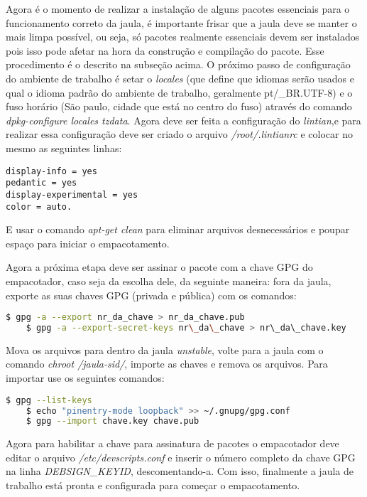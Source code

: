 Agora é o momento de realizar a instalação de alguns pacotes essenciais para o funcionamento correto da jaula, é importante frisar que a jaula deve se manter o mais limpa possível, ou seja, só pacotes realmente essenciais devem ser instalados pois isso pode afetar na hora da construção e compilação do pacote. Esse procedimento é o descrito na subseção acima. O próximo passo de configuração do ambiente de trabalho é setar o \textit{locales} (que define que idiomas serão usados e qual o idioma padrão do ambiente de trabalho, geralmente pt/\_BR.UTF-8) e o fuso horário (São paulo, cidade que está no centro do fuso) através do comando \textit{dpkg-configure locales tzdata}. Agora deve ser feita a configuração do \textit{lintian},e para realizar essa configuração deve ser criado o arquivo \textit{/root/.lintianrc} e colocar no mesmo as seguintes linhas: 

\begin{verbatim}
display-info = yes 
pedantic = yes 
display-experimental = yes 
color = auto.
\end{verbatim}

E usar o comando \textit{apt-get clean} para eliminar arquivos desnecessários e poupar espaço para iniciar o empacotamento.

Agora a próxima etapa deve ser assinar o pacote com a chave GPG do empacotador, caso seja da escolha dele, da seguinte maneira: fora da jaula, exporte as suas chaves GPG (privada e pública) com os comandos:

\begin{lstlisting}[language=bash]
	$ gpg -a --export nr_da_chave > nr_da_chave.pub 
	$ gpg -a --export-secret-keys nr\_da\_chave > nr\_da\_chave.key
\end{lstlisting} 

Mova os arquivos para dentro da jaula \textit{unstable}, volte para a jaula com o comando \textit{chroot /jaula-sid/}, importe as chaves e remova os arquivos. Para importar use os seguintes comandos: 

\begin{lstlisting}[language=bash]
	$ gpg --list-keys 
	$ echo "pinentry-mode loopback" >> ~/.gnupg/gpg.conf 
	$ gpg --import chave.key chave.pub 
\end{lstlisting}

Agora para habilitar a chave para assinatura de pacotes o empacotador deve editar o arquivo \textit{/etc/devscripts.conf} e inserir o número completo da chave GPG na linha \textit{DEBSIGN\_KEYID}, descomentando-a. Com isso, finalmente a jaula de trabalho está pronta e configurada para começar o empacotamento.

